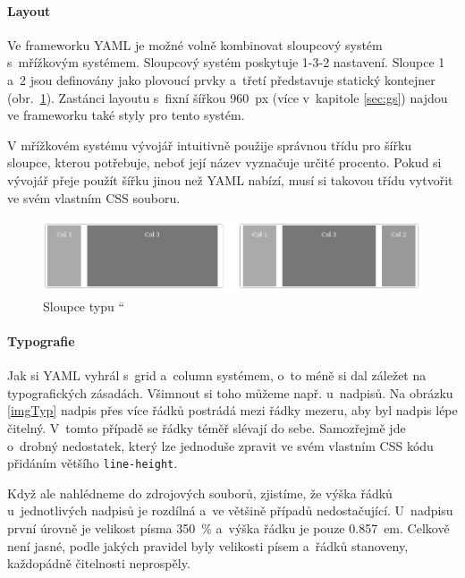 \documentclass[thesis=B,czech]{FITthesis}[2012/06/26]
\begin{document}
\paragraph{Layout}

Ve frameworku \gls{YAML} je možné volně kombinovat sloupcový systém s~mřížkovým systémem. Sloupcový systém poskytuje 1-3-2 nastavení. Sloupce 1 a~2 jsou definovány jako plovoucí prvky a~třetí představuje statický kontejner (obr.~\ref{imgCol}). Zastánci layoutu s~fixní šířkou 960~px (více v~kapitole \ref{sec:gs}) najdou ve frameworku také styly pro tento systém. 

V mřížkovém systému vývojář intuitivně použije správnou třídu pro šířku sloupce, kterou potřebuje, neboť její název vyznačuje určité procento. Pokud si vývojář přeje použít šířku jinou než \gls{YAML} nabízí, musí si takovou třídu vytvořit ve svém vlastním \gls{CSS} souboru.  

\begin{figure}[h]
	\begin{center}
	\includegraphics[scale=0.6]{images/image05.png}
	\end{center}
	\caption{Sloupce typu \textquotedblleft \cite{yaml}}
	\label{imgCol}
\end{figure}

\paragraph{Typografie}

Jak si \gls{YAML} vyhrál s~grid a~column systémem, o~to méně si dal záležet na typografických zásadách. Všimnout si toho můžeme např. u~nadpisů. Na obrázku \ref{imgTyp} nadpis přes více řádků postrádá mezi řádky mezeru, aby byl nadpis lépe čitelný. V~tomto případě se řádky téměř slévají do sebe. Samozřejmě jde o~drobný nedostatek, který lze jednoduše zpravit ve svém vlastním \gls{CSS} kódu přidáním většího \verb#line-height#.

Když ale nahlédneme do zdrojových souborů, zjistíme, že výška řádků u~jednotlivých nadpisů je rozdílná a~ve většině případů nedostačující. U~nadpisu první úrovně je velikost písma 350~\% a~výška řádku je pouze 0.857~em. Celkově není jasné, podle jakých pravidel byly velikosti písem a~řádků stanoveny, každopádně čitelnosti neprospěly.
\end{document}
